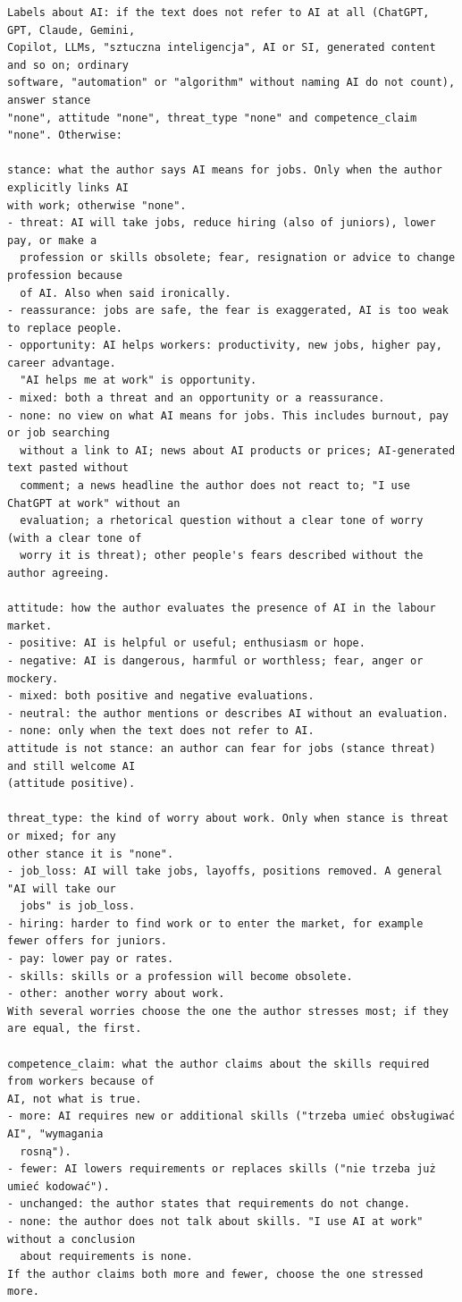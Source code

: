 \documentclass[11pt]{article}
\begin{document}
\begin{lstlisting}
Labels about AI: if the text does not refer to AI at all (ChatGPT, GPT, Claude, Gemini,
Copilot, LLMs, "sztuczna inteligencja", AI or SI, generated content and so on; ordinary
software, "automation" or "algorithm" without naming AI do not count), answer stance
"none", attitude "none", threat_type "none" and competence_claim "none". Otherwise:

stance: what the author says AI means for jobs. Only when the author explicitly links AI
with work; otherwise "none".
- threat: AI will take jobs, reduce hiring (also of juniors), lower pay, or make a
  profession or skills obsolete; fear, resignation or advice to change profession because
  of AI. Also when said ironically.
- reassurance: jobs are safe, the fear is exaggerated, AI is too weak to replace people.
- opportunity: AI helps workers: productivity, new jobs, higher pay, career advantage.
  "AI helps me at work" is opportunity.
- mixed: both a threat and an opportunity or a reassurance.
- none: no view on what AI means for jobs. This includes burnout, pay or job searching
  without a link to AI; news about AI products or prices; AI-generated text pasted without
  comment; a news headline the author does not react to; "I use ChatGPT at work" without an
  evaluation; a rhetorical question without a clear tone of worry (with a clear tone of
  worry it is threat); other people's fears described without the author agreeing.

attitude: how the author evaluates the presence of AI in the labour market.
- positive: AI is helpful or useful; enthusiasm or hope.
- negative: AI is dangerous, harmful or worthless; fear, anger or mockery.
- mixed: both positive and negative evaluations.
- neutral: the author mentions or describes AI without an evaluation.
- none: only when the text does not refer to AI.
attitude is not stance: an author can fear for jobs (stance threat) and still welcome AI
(attitude positive).

threat_type: the kind of worry about work. Only when stance is threat or mixed; for any
other stance it is "none".
- job_loss: AI will take jobs, layoffs, positions removed. A general "AI will take our
  jobs" is job_loss.
- hiring: harder to find work or to enter the market, for example fewer offers for juniors.
- pay: lower pay or rates.
- skills: skills or a profession will become obsolete.
- other: another worry about work.
With several worries choose the one the author stresses most; if they are equal, the first.

competence_claim: what the author claims about the skills required from workers because of
AI, not what is true.
- more: AI requires new or additional skills ("trzeba umieć obsługiwać AI", "wymagania
  rosną").
- fewer: AI lowers requirements or replaces skills ("nie trzeba już umieć kodować").
- unchanged: the author states that requirements do not change.
- none: the author does not talk about skills. "I use AI at work" without a conclusion
  about requirements is none.
If the author claims both more and fewer, choose the one stressed more.


\end{lstlisting}
\end{document}
